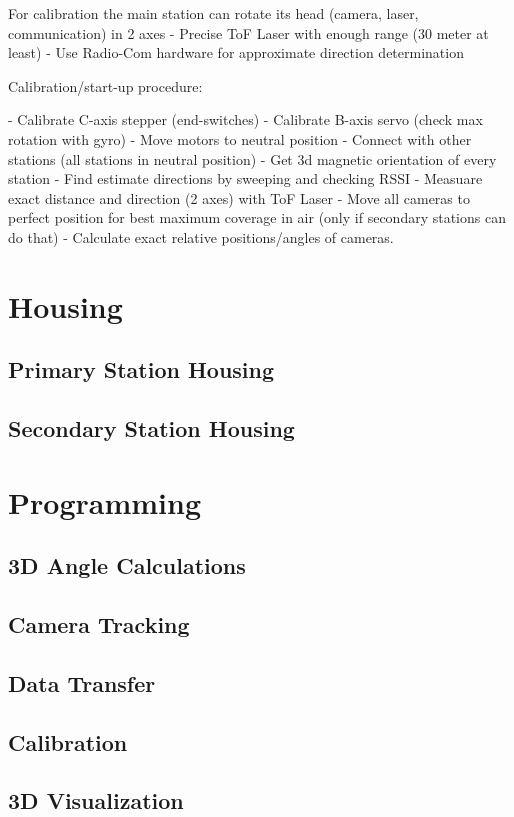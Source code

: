 For calibration the main station can rotate its head (camera, laser, communication) in 2 axes
- Precise ToF Laser with enough range (30 meter at least)
- Use Radio-Com hardware for approximate direction determination

Calibration/start-up procedure:

- Calibrate C-axis stepper (end-switches)
- Calibrate B-axis servo (check max rotation with gyro)
- Move motors to neutral position
- Connect with other stations (all stations in neutral position)
- Get 3d magnetic orientation of every station
- Find estimate directions by sweeping and checking RSSI
- Measuare exact distance and direction (2 axes) with ToF Laser
- Move all cameras to perfect position for best maximum coverage in air (only if secondary stations can do that)
- Calculate exact relative positions/angles of cameras.

\section{Housing}

\subsection{Primary Station Housing}

\subsection{Secondary Station Housing}

\section{Programming}

\subsection{3D Angle Calculations}

\subsection{Camera Tracking}

\subsection{Data Transfer}

\subsection{Calibration}

\subsection{3D Visualization}
